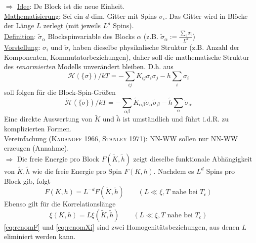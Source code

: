 \begin{enumerate}[A)]
    $\Rightarrow$ \underline{Idee}: De Block ist die neue Einheit. \\
    \underline{Mathematisierung}: Sei ein $d$-dim. Gitter mit Spins $\sigma_i$. Das Gitter wird in Blöcke der Länge $L$ zerlegt (mit jeweils $L^d$ Spins). \\
    \underline{Definition}: $\tilde{\sigma}_\alpha$ Blockspinvariable des Blocks $\alpha$ (z.B. $\tilde{\sigma}_\alpha := \frac{\sum_i \sigma_i}{L^d}$) \\
    \underline{Vorstellung}: $\sigma_i$ und $\tilde{\sigma}_i$ haben dieselbe physikalische Struktur (z.B. Anzahl der Komponenten, Kommutatorbeziehungen),
    daher soll die mathematische Struktur des \emph{renormierten} Modells unverändert bleiben. D.h. aus
    \begin{equation}
        \mathscr{H}(\{\sigma\})/kT = - \sum_{ij} K_{ij} \sigma_i \sigma_j - h \sum_i \sigma_i
    \end{equation}
    soll folgen für die Block-Spin-Größen
    \begin{equation}
        \tilde{\mathscr{H}} \left( \{ \tilde{\sigma} \} \right)  /kT = - \sum_{\alpha \beta} \tilde{K}_{\alpha \beta} \tilde{\sigma}_\alpha \tilde{\sigma}_\beta - \tilde{h} \sum_\alpha \tilde{\sigma}_\alpha
    \end{equation}
    Eine direkte Auswertung von $\tilde{K}$ und $\tilde{h}$ ist umständlich und führt i.d.R. zu komplizierten Formen. \\
    \underline{Vereinfachung} (\textsc{Kadanoff} 1966, \textsc{Stanley} 1971): NN-WW sollen nur NN-WW erzeugen (Annahme). \\
    $\Rightarrow$ Die freie Energie pro Block $F(\tilde{K}, \tilde{h})$ zeigt dieselbe funktionale Abhängigkeit von $\tilde{K}, \tilde{h}$ wie die
    freie Energie pro Spin $F(K, h)$. Nachdem es $L^d$ Spins pro Block gib, folgt
    \begin{equation}
        \label{eq:renomF}
        F(K, h) = L^{-d}  F(\tilde{K}, \tilde{h}) \qquad \left( L \ll \xi, T \text{ nahe bei } T_c \right)
    \end{equation}
    Ebenso gilt für die Korrelationslänge
    \begin{equation}
        \label{eq:renomXi}
        \xi(K, h) = L \xi(\tilde{K}, \tilde{h})\qquad \left( L \ll \xi, T \text{ nahe bei } T_c \right)
    \end{equation}
    \autoref{eq:renomF} und \autoref{eq:renomXi} sind zwei Homogenitätsbeziehungen, aus denen $L$ eliminiert werden kann. \\

\end{enumerate}
